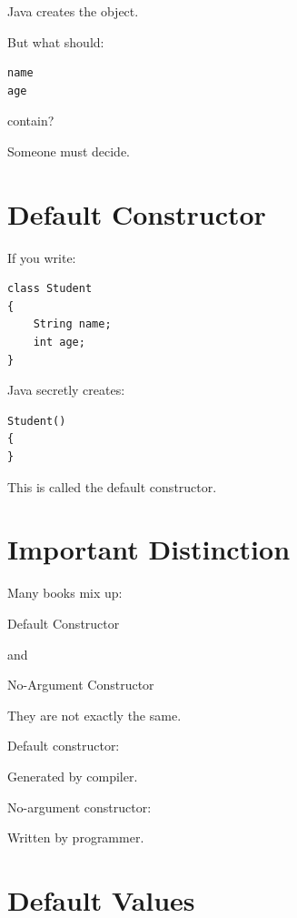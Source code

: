 \documentclass[11pt,a4paper]{book}
\begin{document}
Java creates the object.

But what should:

\begin{verbatim}
name
age
\end{verbatim}

contain?

Someone must decide.


\section{Default Constructor}

If you write:

\begin{verbatim}
class Student
{
    String name;
    int age;
}
\end{verbatim}

Java secretly creates:

\begin{verbatim}
Student()
{
}
\end{verbatim}

This is called the default constructor.


\section{Important Distinction}

\begin{trap}

Many books mix up:

Default Constructor

and

No-Argument Constructor

They are not exactly the same.

\end{trap}

Default constructor:

Generated by compiler.

No-argument constructor:

Written by programmer.


\section{Default Values}
\end{document}
